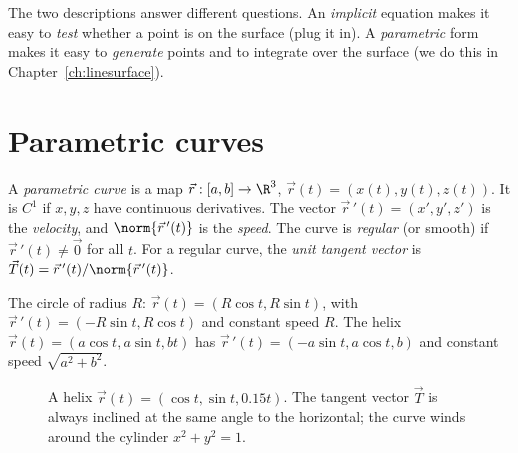 \begin{intuition}
The two descriptions answer different questions. An \emph{implicit} equation makes it easy to \emph{test} whether a point is on the surface (plug it in). A \emph{parametric} form makes it easy to \emph{generate} points and to integrate over the surface (we do this in Chapter~\ref{ch:linesurface}).
\end{intuition}

\section{Parametric curves}

\begin{definition}
A \emph{parametric curve} is a map $\vec r:[a,b]\to\R^3$, $\vec r(t)=(x(t),y(t),z(t))$. It is \emph{$C^1$} if $x,y,z$ have continuous derivatives. The vector $\vec r\,'(t)=(x',y',z')$ is the \emph{velocity}, and $\norm{\vec r\,'(t)}$ is the \emph{speed}. The curve is \emph{regular} (or smooth) if $\vec r\,'(t)\neq\vec 0$ for all $t$. For a regular curve, the \emph{unit tangent vector} is $\vec T(t)=\vec r\,'(t)/\norm{\vec r\,'(t)}$.
\end{definition}

\begin{example}
The circle of radius $R$: $\vec r(t)=(R\cos t,R\sin t)$, with $\vec r\,'(t)=(-R\sin t,R\cos t)$ and constant speed $R$. The helix $\vec r(t)=(a\cos t,a\sin t,bt)$ has $\vec r\,'(t)=(-a\sin t,a\cos t,b)$ and constant speed $\sqrt{a^2+b^2}$.
\end{example}

\begin{figure}[ht]
\centering
{}
\caption{A helix $\vec r(t)=(\cos t,\sin t,0.15t)$. The tangent vector $\vec T$ is always inclined at the same angle to the horizontal; the curve winds around the cylinder $x^2+y^2=1$.}
\label{fig:helix}
\end{figure}

